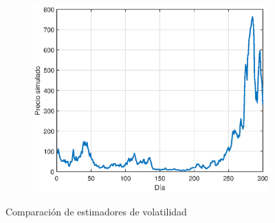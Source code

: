 \begin{figure}[H]
\begin{subfigure}[b]{0.45\linewidth}
        \includegraphics[width=\linewidth]{Imagenes/7_Volatilidad/Accion.eps}
    \end{subfigure}
    \caption{Comparación de estimadores de volatilidad}
\end{figure}



